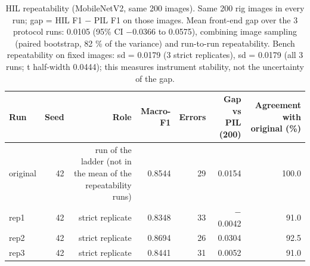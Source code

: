 \begin{table}[htbp]
\centering
\scriptsize
\caption{HIL repeatability (MobileNetV2, same 200 images). Same 200 rig images in every run; gap = HIL F1 $-$ PIL F1 on those images. Mean front-end gap over the 3 protocol runs: 0.0105 (95\% CI $-$0.0366 to 0.0575), combining image sampling (paired bootstrap, 82 \% of the variance) and run-to-run repeatability. Bench repeatability on fixed images: sd = 0.0179 (3 strict replicates), sd = 0.0179 (all 3 runs; t half-width 0.0444); this measures instrument stability, not the uncertainty of the gap.}
\label{tab:ladder-coco-niclavision-4}
\begin{tabular}{lrrrrrr}
\toprule
Run & Seed & Role & Macro-F1 & Errors & Gap vs PIL (200) & Agreement with original (\%) \\
\midrule
original & 42 & run of the ladder (not in the mean of the repeatability runs) & 0.8544 & 29 & 0.0154 & 100.0 \\
rep1 & 42 & strict replicate & 0.8348 & 33 & $-$0.0042 & 91.0 \\
rep2 & 42 & strict replicate & 0.8694 & 26 & 0.0304 & 92.5 \\
rep3 & 42 & strict replicate & 0.8441 & 31 & 0.0052 & 91.0 \\
\bottomrule
\end{tabular}
\end{table}

